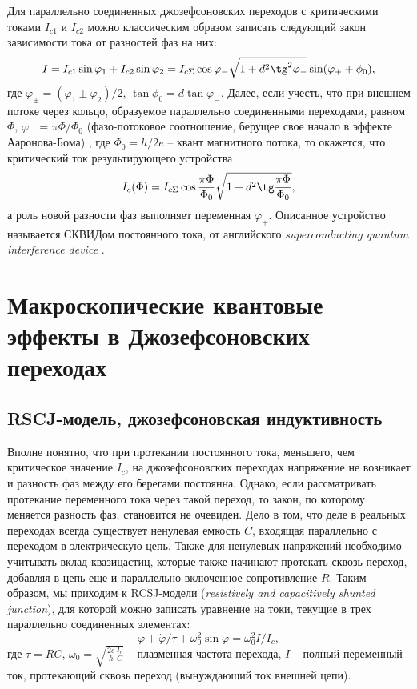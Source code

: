\documentclass[14pt, a4paper]{extreport}
\numberwithin{equation}{section}
\begin{document}
Для параллельно соединенных джозефсоновских переходов с критическими токами $I_{c1}$ и $I_{c2}$ можно классическим образом записать следующий закон зависимости тока от разностей фаз на них:
\begin{equation}
	I = I_{c1}\sin \varphi_1 + I_{c2}\sin \varphi_2 = I_{c\Sigma} \cos \varphi_- \sqrt{1+d^2 \tg^2 \varphi_-} \sin (\varphi_+ + \phi_0),
\end{equation}
где $\varphi_{\pm} = (\varphi_1 \pm \varphi_2)/2$, $\tan \phi_0 = d \tan \varphi_-$. Далее, если учесть, что при внешнем потоке через кольцо, образуемое параллельно соединенными переходами, равном $\Phi$, $\varphi_-$ = $\pi \Phi/\Phi_0$ (фазо-потоковое соотношение, берущее свое начало в эффекте Ааронова-Бома) \cite{shmidt}, где $\Phi_0 = h/2e$ -- квант магнитного потока, то окажется, что критический ток результирующего устройства
\begin{equation}
	I_c (\Phi) = I_{c\Sigma} \cos \frac{\pi \Phi}{\Phi_0} \sqrt{1+d^2 \tg \frac{\pi \Phi}{\Phi_0}},
\end{equation}
а роль новой разности фаз выполняет переменная $\varphi_+$. Описанное устройство называется СКВИДом постоянного тока, от английского \textit{superconducting quantum interference device} \cite{jacklevic1964silver, jaklevic1964quantum}.

\section{Макроскопические квантовые эффекты в Джозефсоновских переходах}
\subsection{RSCJ-модель, джозефсоновская индуктивность}

Вполне понятно, что при протекании постоянного тока, меньшего, чем критическое значение $I_c$, на джозефсоновских переходах напряжение не возникает и разность фаз между его берегами постоянна. Однако, если рассматривать протекание переменного тока через такой переход, то закон, по которому меняется разность фаз, становится не очевиден. Дело в том, что деле в реальных переходах всегда существует ненулевая емкость $C$, входящая параллельно с переходом в электрическую цепь. Также для ненулевых напряжений необходимо учитывать вклад квазицастиц, которые также начинают протекать сквозь переход, добавляя в цепь еще и параллельно включенное сопротивление $R$. Таким образом, мы приходим к RCSJ-модели (\textit{resistively and capacitively shunted junction}), для которой можно записать уравнение на токи, текущие в трех параллельно соединенных элементах\cite{stewart1968current}:
\begin{equation}
	\ddot \varphi + \dot \varphi/\tau + \omega_0^2 \sin \varphi = \omega_0^2 I/I_c,\label{eq:rcsj_current}
\end{equation}
где $\tau = RC$, $\omega_0 =\sqrt{\frac{2e}{\hbar}\frac{I_c}{C}}$ -- плазменная частота перехода, $I$ -- полный переменный ток, протекающий сквозь переход (вынуждающий ток внешней цепи). 
\end{document}
